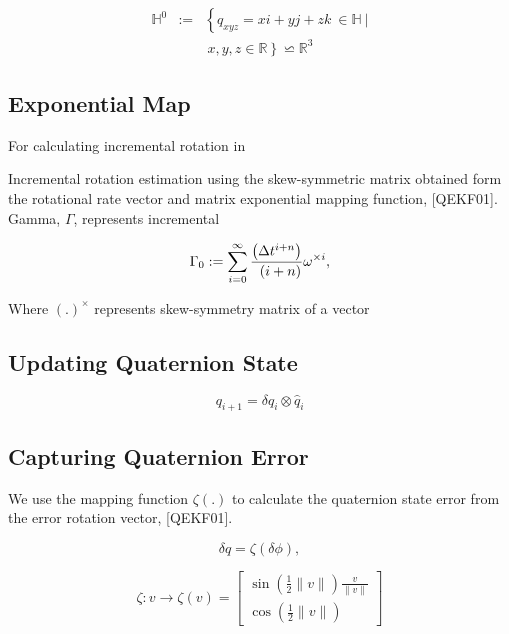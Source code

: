 \documentclass[letterpaper, 10 pt, conference]{ieeeconf}  %
\begin{document}
\begin{eqnarray}\nonumber
\label{eq:11}
\mathbb{H}^{0} &:=& \left\{ q_{xyz}=xi+yj+zk~ \in \mathbb{H}~| \right.\\
&& \left. ~x,y,z \in \mathbb{R} \right\} \backsimeq  \mathbb{R}^3
\end{eqnarray}



\subsection{Exponential Map}

For calculating incremental rotation in

Incremental rotation estimation using the skew-symmetric matrix obtained form
the rotational rate vector and matrix exponential mapping function, [QEKF01].
Gamma, $\Gamma$, represents incremental

\begin{equation}
\label{eq:}
\Gamma_{0} := \sum_{i=0}^{\infty} \frac{ \left( \Delta t^{i+n}  \right)}{ \\
\left( i + n \right) \! } \\
\omega^{\times i},
\end{equation}

Where $(.)^{\times}$ represents skew-symmetry matrix of a vector


\subsection{Updating Quaternion State}
\begin{equation}
\label{eq:12}
q_{i+1} = \delta q_{i} \otimes \widehat{q}_{i}
\end{equation}



\subsection{Capturing Quaternion Error}
We use the mapping function $\zeta(.)$ to calculate the quaternion
state error from the error rotation vector, [QEKF01].

\begin{equation}
\label{eq:13}
\delta q = \zeta(\delta \phi),
\end{equation}

\begin{equation}
\label{eq:14}
\zeta : v \rightarrow \zeta(v) =
        \begin{bmatrix}
        \sin(\frac{1}{2}\|v\|) \frac{v}{\|v\|} \\
        \cos(\frac{1}{2}\|v\|)
        \end{bmatrix}
\end{equation}
\end{document}
